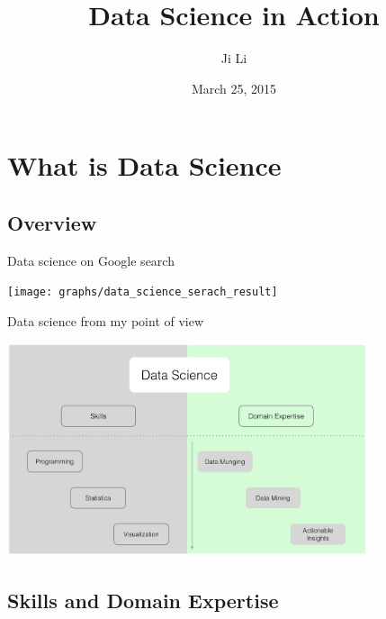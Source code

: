\documentclass[10pt]{beamer}
\title[Data Science]{Data Science in Action}
\author[vieplivee@gmail.com]{Ji Li}
\institute[Yesware]{Data Scientist}
\date{March 25, 2015}
\begin{document}
    \frame[plain]{\titlepage}


\section{What is Data Science}

  \subsection{Overview}

    \begin{frame}{Data science on Google search}
      \begin{center}
        \texttt{[image: graphs/data\_science\_serach\_result]}
      \end{center}
    \end{frame}

    \begin{frame}{Data science from my point of view}
      \begin{center}
        \includegraphics[width=300pt]{graphs/data_science_structure}
      \end{center}
    \end{frame}


  \subsection{Skills and Domain Expertise}
  
\end{document}
